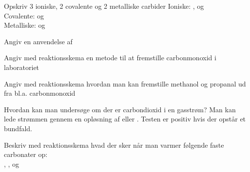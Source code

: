 \begin{flashcard}[Egenskab]{Opskriv 3 ioniske, 2 covalente og 2 metalliske carbider}
Ioniske: ,  og \\ \vspace{7pt}
Covalente:  og \\ \vspace{7pt}
Metalliske:  og 
\end{flashcard}

\begin{flashcard}[Anvendelse]{Angiv en anvendelse af }
\end{flashcard}

\begin{flashcard}[Fremstilling]{Angiv med reaktionsskema en metode til at fremstille carbonmonoxid i laboratoriet}
\end{flashcard}

\begin{flashcard}[Fremstilling]{Angiv med reaktionsskema hvordan man kan fremstille methanol og propanal ud fra bl.a. carbonmonoxid}
 \\ \vspace{7pt}
\end{flashcard}

\begin{flashcard}[Anvendelse]{Hvordan kan man undersøge om der er carbondioxid i en gasstrøm?}
Man kan lede strømmen gennem en opløsning af   eller . Testen er positiv hvis der opstår et bundfald.
\end{flashcard}

\begin{flashcard}[Reaktion]{Beskriv med reaktionsskema hvad der sker når man varmer følgende faste carbonater op:\\ \vspace{7pt}
, ,  og 
}
\\ \vspace{7pt}
\\
\\ \vspace{7pt}
\\ \vspace{7pt}
\end{flashcard}


